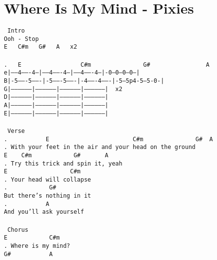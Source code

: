 \newpage
\section{Where Is My Mind - Pixies}
\label{Where Is My Mind - Pixies}
\texttt{\lbrack\ Intro\rbrack\\
Ooh\ -\ Stop\\
E\ \ \ C\#m\ \ \ G\#\ \ \ A\ \ \ x2\\
\\
. \ \ E\ \ \ \ \ \ \ \ \ \ \ \ \ \ \ \ \ C\#m\ \ \ \ \ \ \ \ \ \ \ \ \ \ \ G\#\ \ \ \ \ \ \ \ \ \ \ \ \ \ \ \ A\\
e|-----4-------4---|-----4-------4---|-----4-------4---|-0---0---0---0---|\\
B|-5-------5-------|-5-------5-------|-4-------4-------|-5---5p4-5---5-0-|\\
G|-----------------|-----------------|-----------------|-----------------|\ \ x2\\
D|-----------------|-----------------|-----------------|-----------------|\\
A|-----------------|-----------------|-----------------|-----------------|\\
E|-----------------|-----------------|-----------------|-----------------|\\
\\
\lbrack\ Verse\rbrack\\
. \ \ \ \ \ \ \ \ \ \ E\ \ \ \ \ \ \ \ \ \ \ \ \ \ \ \ \ \ \ \ \ \ \ \ C\#m\ \ \ \ \ \ \ \ \ \ \ \ \ \ \ G\#\ \ A\\
. With\ your\ feet\ in\ the\ air\ and\ your\ head\ on\ the\ ground\\
E\ \ \ \ C\#m\ \ \ \ \ \ \ \ \ \ \ \ G\#\ \ \ \ \ \ \ A\\
. Try\ this\ trick\ and\ spin\ it,\ yeah\\
E\ \ \ \ \ \ \ \ \ \ \ \ \ \ \ \ \ \ C\#m\\
. Your\ head\ will\ collapse\\
. \ \ \ \ \ \ \ \ \ \ \ G\#\\
But\ there's\ nothing\ in\ it\\
. \ \ \ \ \ \ \ \ \ \ A\\
And\ you'll\ ask\ yourself\\
\\
\lbrack\ Chorus\rbrack\\
E\ \ \ \ \ \ \ \ \ \ \ \ C\#m\\
. Where\ is\ my\ mind?\\
G\#\ \ \ \ \ \ \ \ \ \ \ A\\
}
